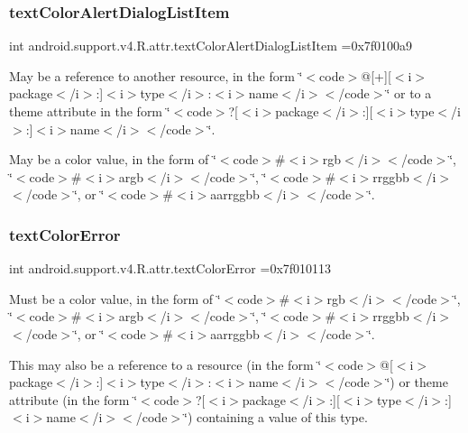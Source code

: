 \subsubsection{\texorpdfstring{text\+Color\+Alert\+Dialog\+List\+Item}{textColorAlertDialogListItem}}
{\footnotesize\ttfamily int android.\+support.\+v4.\+R.\+attr.\+text\+Color\+Alert\+Dialog\+List\+Item =0x7f0100a9\hspace{0.3cm}{\ttfamily [static]}}

May be a reference to another resource, in the form \char`\"{}$<$code$>$@\mbox{[}+\mbox{]}\mbox{[}$<$i$>$package$<$/i$>$\+:\mbox{]}$<$i$>$type$<$/i$>$\+:$<$i$>$name$<$/i$>$$<$/code$>$\char`\"{} or to a theme attribute in the form \char`\"{}$<$code$>$?\mbox{[}$<$i$>$package$<$/i$>$\+:\mbox{]}\mbox{[}$<$i$>$type$<$/i$>$\+:\mbox{]}$<$i$>$name$<$/i$>$$<$/code$>$\char`\"{}. 

May be a color value, in the form of \char`\"{}$<$code$>$\#$<$i$>$rgb$<$/i$>$$<$/code$>$\char`\"{}, \char`\"{}$<$code$>$\#$<$i$>$argb$<$/i$>$$<$/code$>$\char`\"{}, \char`\"{}$<$code$>$\#$<$i$>$rrggbb$<$/i$>$$<$/code$>$\char`\"{}, or \char`\"{}$<$code$>$\#$<$i$>$aarrggbb$<$/i$>$$<$/code$>$\char`\"{}. \mbox{\label{classandroid_1_1support_1_1v4_1_1R_1_1attr_aef1b465301aac63a751d46963c485c84}} 
\subsubsection{\texorpdfstring{text\+Color\+Error}{textColorError}}
{\footnotesize\ttfamily int android.\+support.\+v4.\+R.\+attr.\+text\+Color\+Error =0x7f010113\hspace{0.3cm}{\ttfamily [static]}}

Must be a color value, in the form of \char`\"{}$<$code$>$\#$<$i$>$rgb$<$/i$>$$<$/code$>$\char`\"{}, \char`\"{}$<$code$>$\#$<$i$>$argb$<$/i$>$$<$/code$>$\char`\"{}, \char`\"{}$<$code$>$\#$<$i$>$rrggbb$<$/i$>$$<$/code$>$\char`\"{}, or \char`\"{}$<$code$>$\#$<$i$>$aarrggbb$<$/i$>$$<$/code$>$\char`\"{}. 

This may also be a reference to a resource (in the form \char`\"{}$<$code$>$@\mbox{[}$<$i$>$package$<$/i$>$\+:\mbox{]}$<$i$>$type$<$/i$>$\+:$<$i$>$name$<$/i$>$$<$/code$>$\char`\"{}) or theme attribute (in the form \char`\"{}$<$code$>$?\mbox{[}$<$i$>$package$<$/i$>$\+:\mbox{]}\mbox{[}$<$i$>$type$<$/i$>$\+:\mbox{]}$<$i$>$name$<$/i$>$$<$/code$>$\char`\"{}) containing a value of this type. \mbox{\label{classandroid_1_1support_1_1v4_1_1R_1_1attr_a3dce28340c463d79b7547b6bac8e41cd}} 
